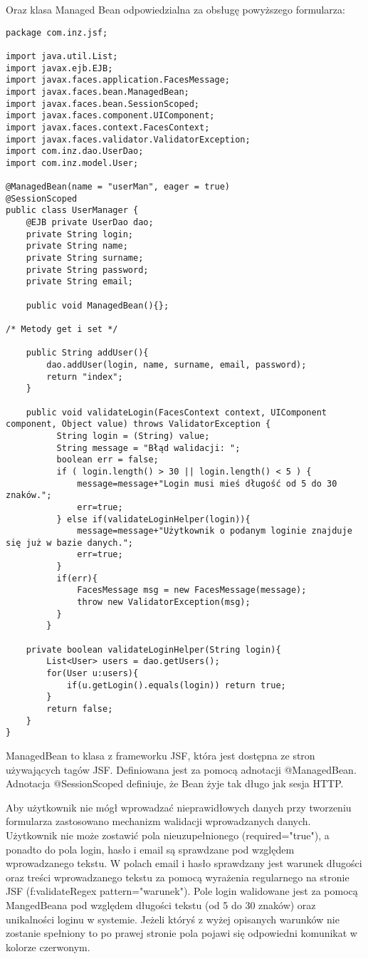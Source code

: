 Oraz klasa Managed Bean odpowiedzialna za obsługę powyższego formularza:
\begin{lstlisting}[breaklines=true]
package com.inz.jsf;

import java.util.List;
import javax.ejb.EJB;
import javax.faces.application.FacesMessage;
import javax.faces.bean.ManagedBean;
import javax.faces.bean.SessionScoped;
import javax.faces.component.UIComponent;
import javax.faces.context.FacesContext;
import javax.faces.validator.ValidatorException;
import com.inz.dao.UserDao;
import com.inz.model.User;

@ManagedBean(name = "userMan", eager = true)
@SessionScoped
public class UserManager {
	@EJB private UserDao dao;
	private String login;
	private String name;
	private String surname;
	private String password;
	private String email;
	
	public void ManagedBean(){};
	
/* Metody get i set */

	public String addUser(){
		dao.addUser(login, name, surname, email, password);
		return "index";
	}
	
	public void validateLogin(FacesContext context, UIComponent component, Object value) throws ValidatorException {
		  String login = (String) value;
		  String message = "Błąd walidacji: ";
		  boolean err = false;
		  if ( login.length() > 30 || login.length() < 5 ) {
			  message=message+"Login musi mieś długość od 5 do 30 znaków.";
			  err=true;
		  } else if(validateLoginHelper(login)){
			  message=message+"Użytkownik o podanym loginie znajduje się już w bazie danych.";
			  err=true;
		  }  
		  if(err){
			  FacesMessage msg = new FacesMessage(message);
		      throw new ValidatorException(msg);
		  }
		}
	
	private boolean validateLoginHelper(String login){
		List<User> users = dao.getUsers();
		for(User u:users){
			if(u.getLogin().equals(login)) return true;
		}
		return false;
	}
}
\end{lstlisting}
ManagedBean to klasa z frameworku JSF, która jest dostępna ze stron używających tagów JSF. Definiowana jest za pomocą adnotacji @ManagedBean. Adnotacja @SessionScoped definiuje, że Bean żyje tak długo jak sesja HTTP. 

Aby użytkownik nie mógł wprowadzać nieprawidłowych danych przy tworzeniu formularza zastosowano mechanizm walidacji wprowadzanych danych. Użytkownik nie może zostawić pola nieuzupełnionego (required="true"), a ponadto do pola login, hasło i email są sprawdzane pod względem wprowadzanego tekstu. W polach email i hasło sprawdzany jest warunek długości oraz treści wprowadzanego tekstu za pomocą wyrażenia regularnego na stronie JSF (f:validateRegex pattern="warunek"). Pole login walidowane jest za pomocą MangedBeana pod względem długości tekstu (od 5 do 30 znaków) oraz unikalności loginu w systemie. Jeżeli któryś z wyżej opisanych warunków nie zostanie spełniony to po prawej stronie pola pojawi się odpowiedni komunikat w kolorze czerwonym.

